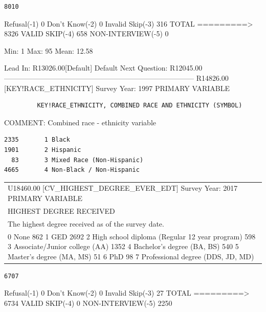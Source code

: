 \documentclass[
  man,floatsintext]{apa6}
\begin{document}
\begin{verbatim}
8010
\end{verbatim}

Refusal(-1) 0
Don't Know(-2) 0
Invalid Skip(-3) 316
TOTAL =========\textgreater{} 8326 VALID SKIP(-4) 658 NON-INTERVIEW(-5) 0

Min: 1 Max: 95 Mean: 12.58

Lead In: R13026.00{[}Default{]}
Default Next Question: R12045.00
--------------------------------------------------------------------------------
R14826.00 {[}KEY!RACE\_ETHNICITY{]} Survey Year: 1997
PRIMARY VARIABLE

\begin{verbatim}
         KEY!RACE_ETHNICITY, COMBINED RACE AND ETHNICITY (SYMBOL)
\end{verbatim}

COMMENT: Combined race - ethnicity variable

\begin{verbatim}
2335       1 Black
1901       2 Hispanic
  83       3 Mixed Race (Non-Hispanic)
4665       4 Non-Black / Non-Hispanic
\end{verbatim}

\begin{longtable}[]{@{}
  >{\centering\arraybackslash}p{}@{}}
\toprule\noalign{}
\begin{minipage}[b]{\linewidth}\centering
8984
\end{minipage} \\
\midrule\noalign{}
\endhead
\bottomrule\noalign{}
\endlastfoot
U18460.00 {[}CV\_HIGHEST\_DEGREE\_EVER\_EDT{]} Survey Year: 2017
PRIMARY VARIABLE \\
HIGHEST DEGREE RECEIVED \\
The highest degree received as of the survey date. \\
514 0 None
862 1 GED
2692 2 High school diploma (Regular 12 year program)
598 3 Associate/Junior college (AA)
1352 4 Bachelor's degree (BA, BS)
540 5 Master's degree (MA, MS)
51 6 PhD
98 7 Professional degree (DDS, JD, MD) \\
\end{longtable}

\begin{verbatim}
6707
\end{verbatim}

Refusal(-1) 0
Don't Know(-2) 0
Invalid Skip(-3) 27
TOTAL =========\textgreater{} 6734 VALID SKIP(-4) 0 NON-INTERVIEW(-5) 2250
\end{document}
